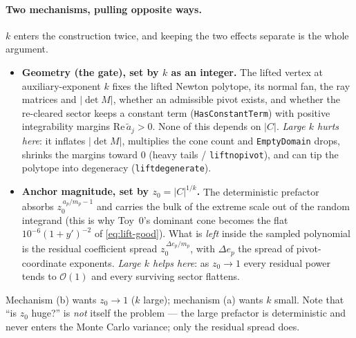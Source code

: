 \documentclass[11pt,a4paper]{article}
\begin{document}
\paragraph{Two mechanisms, pulling opposite ways.} $k$ enters the construction
twice, and keeping the two effects separate is the whole argument.
\begin{itemize}
  \item[(a)] \textbf{Geometry (the gate), set by $k$ as an integer.} The lifted
    vertex at auxiliary-exponent $k$ fixes the lifted Newton polytope, its normal
    fan, the ray matrices and $|\det M|$, whether an admissible pivot exists, and
    whether the re-cleared sector keeps a constant term (\texttt{HasConstantTerm})
    with positive integrability margins $\mathrm{Re}\,\tilde a_j > 0$. None of
    this depends on $|C|$. \emph{Large $k$ hurts here}: it inflates $|\det M|$,
    multiplies the cone count and \texttt{EmptyDomain} drops, shrinks the margins
    toward $0$ (heavy tails / \texttt{liftnopivot}), and can tip the polytope into
    degeneracy (\texttt{liftdegenerate}).
  \item[(b)] \textbf{Anchor magnitude, set by $z_0 = |C|^{1/k}$.} The
    deterministic prefactor absorbs $z_0^{\,a_p/m_p-1}$ and carries the bulk of
    the extreme scale out of the random integrand (this is why Toy~0's dominant
    cone becomes the flat $10^{-6}(1+y')^{-2}$ of \eqref{eq:lift-good}). What is
    \emph{left} inside the sampled polynomial is the residual coefficient spread
    $z_0^{\,\Delta e_p/m_p}$, with $\Delta e_p$ the spread of pivot-coordinate
    exponents. \emph{Large $k$ helps here}: as $z_0 \to 1$ every residual power
    tends to $\mathcal{O}(1)$ and every surviving sector flattens.
\end{itemize}
Mechanism (b) wants $z_0 \to 1$ ($k$ large); mechanism (a) wants $k$ small. Note
that ``is $z_0$ huge?'' is \emph{not} itself the problem --- the large prefactor
is deterministic and never enters the Monte Carlo variance; only the residual
spread does.
\end{document}
